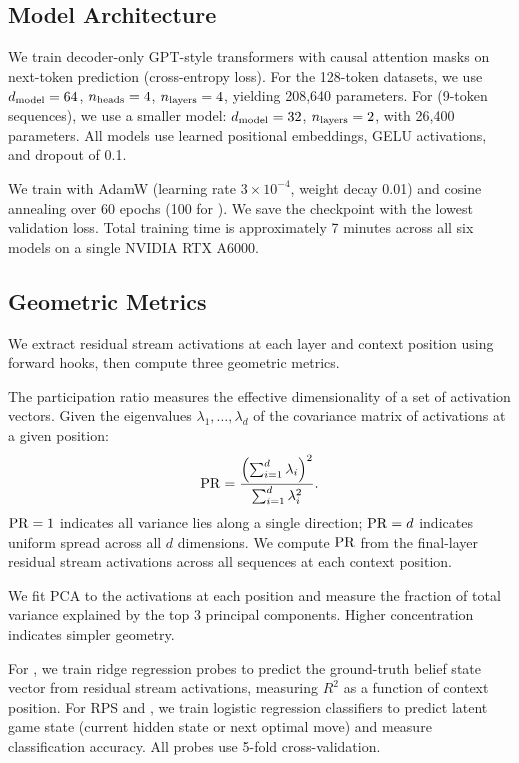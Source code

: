 \subsection{Model Architecture}
\label{sec:architecture}

We train decoder-only GPT-style transformers with causal attention masks on next-token prediction (cross-entropy loss). For the 128-token datasets, we use $d_{\mathrm{model}} = 64$, $n_{\mathrm{heads}} = 4$, $n_{\mathrm{layers}} = 4$, yielding 208,640 parameters. For \ttt (9-token sequences), we use a smaller model: $d_{\mathrm{model}} = 32$, $n_{\mathrm{layers}} = 2$, with 26,400 parameters. All models use learned positional embeddings, GELU activations, and dropout of 0.1.

We train with AdamW (learning rate $3 \times 10^{-4}$, weight decay 0.01) and cosine annealing over 60 epochs (100 for \ttt). We save the checkpoint with the lowest validation loss. Total training time is approximately 7 minutes across all six models on a single NVIDIA RTX A6000.

\subsection{Geometric Metrics}
\label{sec:metrics}

We extract residual stream activations at each layer and context position using forward hooks, then compute three geometric metrics.

The participation ratio measures the effective dimensionality of a set of activation vectors. Given the eigenvalues $\lambda_1, \ldots, \lambda_d$ of the covariance matrix of activations at a given position:
\begin{equation}
\label{eq:pr}
\mathrm{PR} = \frac{\left(\sum_{i=1}^{d} \lambda_i\right)^2}{\sum_{i=1}^{d} \lambda_i^2}.
\end{equation}
$\mathrm{PR} = 1$ indicates all variance lies along a single direction; $\mathrm{PR} = d$ indicates uniform spread across all $d$ dimensions. We compute $\mathrm{PR}$ from the final-layer residual stream activations across all sequences at each context position.

We fit PCA to the activations at each position and measure the fraction of total variance explained by the top 3 principal components. Higher concentration indicates simpler geometry.

For \messthree, we train ridge regression probes to predict the ground-truth belief state vector from residual stream activations, measuring $R^2$ as a function of context position. For RPS and \ttt, we train logistic regression classifiers to predict latent game state (current hidden state or next optimal move) and measure classification accuracy. All probes use 5-fold cross-validation.

